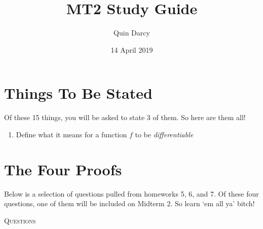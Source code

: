 \documentclass{article}
\theoremstyle{definition}
\theoremstyle{remark}
\theoremstyle{definition}
\begin{document}
\title{MT2 Study Guide}
\author{Quin Darcy}
\date{14 April 2019}
\maketitle

\section{Things To Be Stated}

Of these 15 things, you will be asked to state 3 of them. So here are them all!

\begin{enumerate}[leftmargin=*]
    \item Define what it means for a function $f$ to be \textit{differentiable}
\end{enumerate}

\section{The Four Proofs}

Below is a selection of questions pulled from homeworks 5, 6, and 7. Of these four questions, one of them will be included on Midterm 2. So learn `em all ya' bitch!

\vspace{4mm}

\noindent\textsc{Questions}\par
\hline
\end{document}
